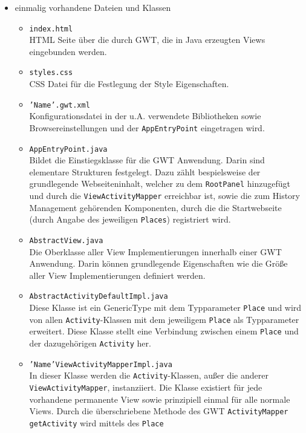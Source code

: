 \begin{itemize}
  \item einmalig vorhandene Dateien und Klassen
  \begin{itemize}
    \item \texttt{index.html}\\
    HTML Seite über die durch GWT, die in Java erzeugten Views
    eingebunden werden.
    \item \texttt{styles.css}\\
    CSS Datei für die Festlegung der Style Eigenschaften.
    \item \texttt{'Name'.gwt.xml}\\
    Konfigurationsdatei in der u.A. verwendete Bibliotheken sowie
    Browsereinstellungen und der \texttt{AppEntryPoint} eingetragen wird.
    \item \texttt{AppEntryPoint.java}\\
    Bildet die Einstiegsklasse für die GWT Anwendung. Darin sind elementare
    Strukturen festgelegt. Dazu zählt bespielsweise der grundlegende
    Webseiteninhalt, welcher zu dem \texttt{RootPanel} hinzugefügt und durch die
    \texttt{ViewActivityMapper} erreichbar ist, sowie die zum
    History Management gehörenden Komponenten, durch die die Startwebseite
    (durch Angabe des jeweiligen \texttt{Places}) registriert wird.
    \item \texttt{AbstractView.java}\\
    Die Oberklasse aller View Implementierungen innerhalb einer GWT
    Anwendung. Darin können grundlegende Eigenschaften wie die Größe aller
    View Implementierungen definiert werden.
    \item \texttt{AbstractActivityDefaultImpl.java}\\
    Diese Klasse ist ein GenericType mit dem Typparameter \texttt{Place} und
    wird von allen \texttt{Activity}-Klassen mit dem jeweiligem
    \texttt{Place} als Typparameter erweitert. 
 	Diese Klasse stellt eine Verbindung zwischen einem \texttt{Place} und der
 	dazugehörigen \texttt{Activity} her.
    \item \texttt{'Name'ViewActivityMapperImpl.java}\\
    In dieser Klasse werden die \texttt{Activity}-Klassen, außer
    die anderer \texttt{ViewActivityMapper}, instanziiert. Die Klasse
    existiert für jede vorhandene permanente View sowie prinzipiell einmal für alle normale
    Views. Durch die überschriebene Methode des GWT
    \texttt{ActivityMapper} \texttt{getActivity} wird mittels des \texttt{Place}

\end{itemize}
\end{itemize}
